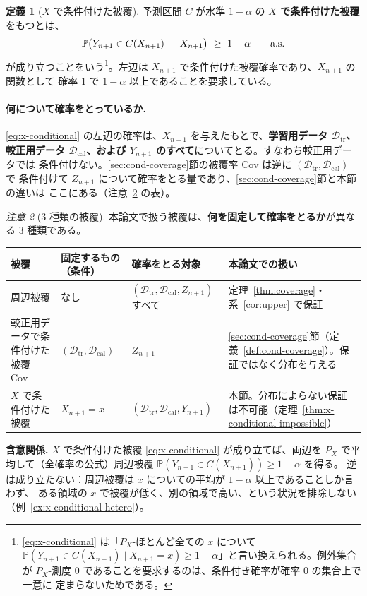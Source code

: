 \documentclass[a4paper,11pt]{jsarticle}
\theoremstyle{definition}
\newtheorem{definition}{定義}[section]
\theoremstyle{plain}
\theoremstyle{remark}
\newtheorem{remark}[definition]{注意}
\newcommand{\Prob}{\mathbb{P}}
\newcommand{\Dtr}{\mathcal{D}_{\mathrm{tr}}}     %
\newcommand{\Dcal}{\mathcal{D}_{\mathrm{cal}}}   %
\begin{document}
\begin{definition}[$X$ で条件付けた被覆]
  \label{def:x-conditional}
  予測区間 $C$ が水準 $1-\alpha$ の \textbf{$X$ で条件付けた被覆}をもつとは、
  \begin{equation}
    \label{eq:x-conditional}
    \Prob\bigl(Y_{n+1}\in C(X_{n+1})\ \bigm|\ X_{n+1}\bigr)\ \ge\ 1-\alpha
    \qquad\text{a.s.}
  \end{equation}
  が成り立つことをいう\footnote{\eqref{eq:x-conditional} は「$P_X$-ほとんど全ての $x$ について
  $\Prob(Y_{n+1}\in C(X_{n+1})\mid X_{n+1}=x)\ge1-\alpha$」と言い換えられる。例外集合が
  $P_X$-測度 $0$ であることを要求するのは、条件付き確率が確率 $0$ の集合上で一意に
  定まらないためである。}。左辺は $X_{n+1}$ で条件付けた被覆確率であり、$X_{n+1}$ の関数として
  確率 $1$ で $1-\alpha$ 以上であることを要求している。
\end{definition}

\paragraph{何について確率をとっているか.}
\eqref{eq:x-conditional} の左辺の確率は、$X_{n+1}$ を与えたもとで、\textbf{学習用データ $\Dtr$、
較正用データ $\Dcal$、および $Y_{n+1}$ のすべて}についてとる。すなわち較正用データでは
条件付けない。\ref{sec:cond-coverage}節の被覆率 $\mathrm{Cov}$ は逆に $(\Dtr,\Dcal)$ で
条件付けて $Z_{n+1}$ について確率をとる量であり、\ref{sec:cond-coverage}節と本節の違いは
ここにある（注意~\ref{rem:x-conditional-three} の表）。

\begin{remark}[$3$ 種類の被覆]
  \label{rem:x-conditional-three}
  \leavevmode
  本論文で扱う被覆は、\textbf{何を固定して確率をとるか}が異なる $3$ 種類である。
  \begin{center}
    \small
    \begin{tabular}{p{9.5em}p{5.5em}p{7.5em}p{12.5em}}
      \toprule
      被覆 & 固定するもの（条件） & 確率をとる対象 & 本論文での扱い \\
      \midrule
      周辺被覆 & なし & $(\Dtr,\Dcal,Z_{n+1})$ すべて
        & 定理~\ref{thm:coverage}・系~\ref{cor:upper} で保証 \\
      較正用データで条件付けた被覆 $\mathrm{Cov}$ & $(\Dtr,\Dcal)$ & $Z_{n+1}$
        & \ref{sec:cond-coverage}節（定義~\ref{def:cond-coverage}）。保証ではなく分布を与える \\
      $X$ で条件付けた被覆 & $X_{n+1}=x$ & $(\Dtr,\Dcal,Y_{n+1})$
        & 本節。分布によらない保証は不可能（定理~\ref{thm:x-conditional-impossible}） \\
      \bottomrule
    \end{tabular}
  \end{center}
  \textbf{含意関係.} $X$ で条件付けた被覆 \eqref{eq:x-conditional} が成り立てば、両辺を
  $P_X$ で平均して（全確率の公式）周辺被覆 $\Prob(Y_{n+1}\in C(X_{n+1}))\ge1-\alpha$ を得る。
  逆は成り立たない：周辺被覆は $x$ についての平均が $1-\alpha$ 以上であることしか言わず、
  ある領域の $x$ で被覆が低く、別の領域で高い、という状況を排除しない
  （例~\ref{ex:x-conditional-hetero}）。
\end{remark}
\end{document}
